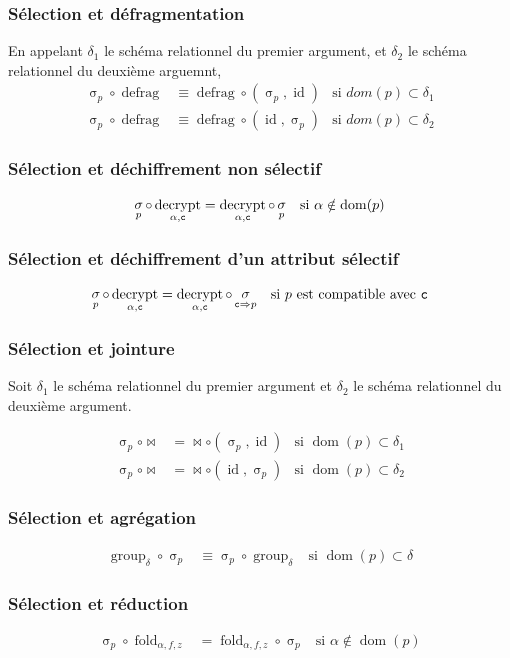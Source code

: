 \documentclass[french]{article}
\DeclareMathOperator{\sel}{\sigma}
\DeclareMathOperator{\defrag}{defrag}
\DeclareMathOperator{\decrypt}{decrypt}
\DeclareMathOperator{\group}{group}
\DeclareMathOperator{\id}{id}
\DeclareMathOperator{\dom}{dom}
\newcommand\typeT[1]{\text{\ttfamily #1}}
\newcommand{\decryptArgs}[2]{\decrypt_{#1 , \typeT{#2}}}
\newcommand{\selP}{\sel_p}
\newcommand{\decryptCAlpha}{\decryptArgs{\alpha}{c}}
\newcommand{\groupDelta}{\group_{\delta}}
\newcommand{\fold}[3]{\operatorname{fold}_{#1, #2, #3}}
\newcommand{\foldAlphafz}{\fold{\alpha}{f}{z}}
\newcommand{\args}{Soit $\delta_1$ le schéma relationnel du premier
	argument et $\delta_2$ le schéma relationnel du deuxième
	argument.}
\begin{document}
\subsubsection*{Sélection et défragmentation}
En appelant $\delta_1$ le schéma relationnel du premier argument,
et $\delta_2$ le schéma relationnel du deuxième arguemnt,
\begin{align}
\selP \circ \defrag 
& \equiv \defrag \circ (\selP, \id)
& \text{si $dom(p) \subset \delta_1$} 
\label{seldefrag1}\\
\selP \circ \defrag 
& \equiv \defrag \circ (\id, \selP)
& \text{si $dom(p) \subset \delta_2$}
\end{align}
\subsubsection*{Sélection et déchiffrement non sélectif}
\begin{align}
\selP \circ \decryptCAlpha 
& = \decryptCAlpha \circ \selP
& \text{si $\alpha \notin \dom(p)$}
\end{align}
\subsubsection*{Sélection et déchiffrement d'un attribut sélectif}
\begin{align}
\selP \circ \decryptCAlpha 
& = \decryptCAlpha \circ \sel_{\typeT{c} \Rightarrow p}
& \text{si $p$  est compatible avec $\typeT{c}$}
\end{align}
\subsubsection*{Sélection et jointure}
\args

\begin{align}
\selP \circ \Join
& = \Join \circ (\selP, \id)
& \text{si $\dom(p) \subset \delta_1$}
\label{seljoin1}\\ 
\selP \circ \Join
& = \Join \circ (\id, \selP)
& \text{si $\dom(p) \subset \delta_2$}
\end{align}
\subsubsection*{Sélection et agrégation}
\begin{align}
\groupDelta \circ \selP 
& \equiv \selP \circ \groupDelta
& \text{si $\dom(p) \subset \delta$}
\end{align}
\subsubsection*{Sélection et réduction}
\begin{align}
\selP \circ \foldAlphafz & = \foldAlphafz \circ \selP
& \text{si $\alpha \notin \dom(p)$}
\end{align}
\end{document}
